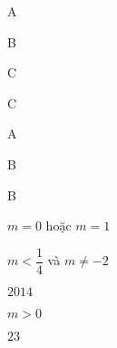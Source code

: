 \begin{Solution}{1}
A
\end{Solution}
\begin{Solution}{2}
B
\end{Solution}
\begin{Solution}{3}
C
\end{Solution}
\begin{Solution}{4}
C
\end{Solution}
\begin{Solution}{5}
A
\end{Solution}
\begin{Solution}{6}
B
\end{Solution}
\begin{Solution}{7}
B
\end{Solution}
\begin{Solution}{8}
$m=0$ hoặc $m=1$
\end{Solution}
\begin{Solution}{9}
$m<\dfrac {1}{4}$ và $m\ne -2$
\end{Solution}
\begin{Solution}{10}
$2014$
\end{Solution}
\begin{Solution}{11}
$m>0$
\end{Solution}
\begin{Solution}{12}
$23$
\end{Solution}
